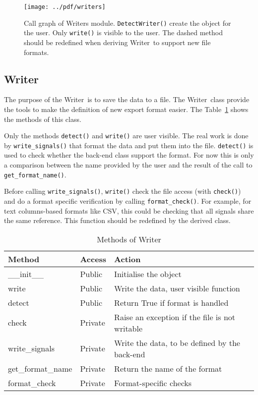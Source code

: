 \documentclass[a4paper,11pt]{article}
\newcommand{\meth}[1]{\texttt{#1()}}
\newcommand{\cls}[1]{\textsf{#1}}
\newcommand{\wrt}{\cls{Writer}}
\begin{document}
\begin{figure}[htbp]
  \centering
  \texttt{[image: ../pdf/writers]}
  \caption{Call graph of Writers module. \meth{DetectWriter} create the object for the user. Only \meth{write} is visible to the user. The dashed method should be redefined when deriving \wrt\ to support new file formats.}
  \label{fig:wrts:callgraph}
\end{figure}
\subsection{Writer}
The purpose of the \wrt\ is to save the data to a file.
The \wrt\ class provide the tools to make the definition of new export format easier.
The Table~\ref{tab:wrts:meth} shows the methods of this class.

Only the methods \meth{detect} and \meth{write} are user visible.
The real work is done by \meth{write\_signals} that format the data and put them into the file.
\meth{detect} is used to check whether the back-end class support the format.
For now this is only a comparison between the name provided by the user and the result of the call to \meth{get\_format\_name}.

Before calling \meth{write\_signals}, \meth{write} check the file access (with \meth{check}) and do a format specific verification by calling \meth{format\_check}.
For example, for text columns-based formats like CSV, this could be checking that all signals share the same reference.
This function should be redefined by the derived class.

\begin{table}[htbp]
  \centering\sf\small
  \begin{tabular}{lll}
    \hline
    Method & Access & Action \\
    \hline
    \_\_init\_\_ & Public & Initialise the object \\
    write        & Public & Write the data, user visible function\\
    detect       & Public & Return True if format is handled\\
    check        & Private& Raise an exception if the file is not writable\\
    write\_signals  & Private& Write the data, to be defined by the back-end\\
    get\_format\_name&Private& Return the name of the format\\
    format\_check   & Private& Format-specific checks\\
    \hline
  \end{tabular}
  \caption{Methods of \wrt}
  \label{tab:wrts:meth}
\end{table}
\end{document}
